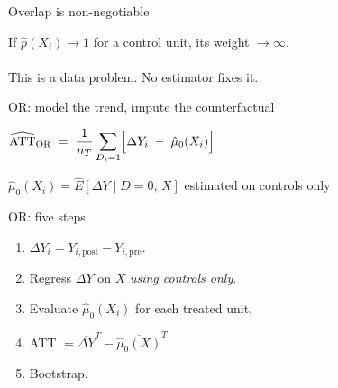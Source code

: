 \documentclass[aspectratio=169,11pt]{beamer}
\begin{document}
\begin{frame}{Overlap is non-negotiable}
\vspace{1.2em}
\begin{center}
\large
If $\hat{p}(X_i) \to 1$ for a control unit, its weight $\to \infty$.\\[0.8em]
\\[0.8em]
\color{warmgray}\normalsize
This is a data problem. No estimator fixes it.
\end{center}
\end{frame}


\begin{frame}{OR: model the trend, impute the counterfactual}
\vspace{1.0em}
\begin{center}
\large
$\widehat{\mathrm{ATT}}_{\mathrm{OR}}
  \;=\; \dfrac{1}{n_T}
        \displaystyle\sum_{D_i=1}
        \Bigl[\Delta Y_i \;-\; \hat\mu_0(X_i)\Bigr]$
\end{center}
\vspace{0.8em}
\begin{center}
\color{warmgray}\small
$\hat\mu_0(X_i) = \widehat{E}[\Delta Y \mid D=0,\,X]$ \quad estimated on controls only
\end{center}
\end{frame}

\begin{frame}{OR: five steps}
\vspace{0.8em}
\begin{enumerate}\setlength\itemsep{0.5em}
  \item {} \;$\Delta Y_i = Y_{i,\mathrm{post}} - Y_{i,\mathrm{pre}}$.
  \item {} \;Regress $\Delta Y$ on $X$ \textit{using controls only}.
  \item {} \;Evaluate $\hat\mu_0(X_i)$ for each treated unit.
  \item {} \;ATT $= \overline{\Delta Y}^T - \overline{\hat\mu_0(X)}^T$.
  \item {} \;Bootstrap.
\end{enumerate}
\end{frame}
\end{document}
